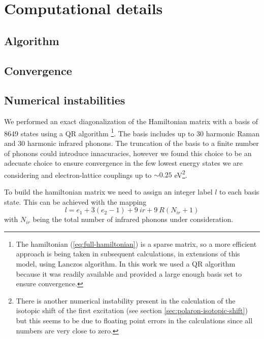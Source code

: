 \chapter{Computational details}
\label{chap:comp_details}

\section{Algorithm}
\label{sec:algorithm}

\section{Convergence}
\label{sec:convergence}

\section{Numerical instabilities}
\label{sec:numerical_instabilities}

We performed an exact diagonalization of the Hamiltonian matrix with a basis of 8649 states using a QR algorithm \cite{eigenweb}\footnote{The hamiltonian (\ref{eq:full-hamiltonian}) is a sparse matrix, so a more efficient approach is being taken in subsequent calculations, in extensions of this model, using Lanczos algorithm. In this work we used a QR algorithm because it was readily available and provided a large enough basis set to ensure convergence.}.
The basis includes up to 30 harmonic Raman and 30 harmonic infrared phonons. 
The  truncation of the basis to a finite number of phonons could introduce innacuracies, however we found this choice to be an adecuate choice to ensure convergence in the few lowest energy states we are considering and electron-lattice couplings up to $\sim0.25$ eV\footnote{There is another numerical instability present in the calculation of the isotopic shift of the first excitation (see section \ref{sec:polaron-isotopic-shift}) but this seems to be due to floating point errors in the calculations since all numbers are very close to zero.}.

To build the hamiltonian matrix we need to assign an integer label $l$ to each basis state. 
This can be achieved with the mapping
%
\begin{equation}
  \label{eq:label}
  l = e_1 + 3(e_2 - 1) + 9\ ir + 9\ R (N_{ir} +1)
\end{equation}
%
with $N_{ir}$ being the total number of infrared phonons under consideration.

